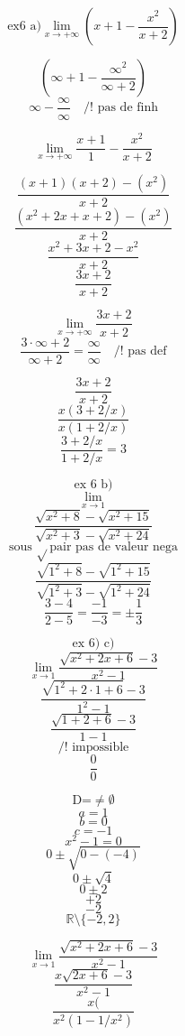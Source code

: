 \documentclass{article}
\begin{document}
\[ \text{ex6 a)} \lim_{x \to +\infty} \left( x+1 - \frac{x^2}{x+2} \right) \]

\[ \left( \infty + 1 - \frac{\infty^2}{\infty+2} \right) \]
\[ \infty - \frac{\infty}{\infty} \quad \text{/!\ pas de finh} \]

\[ \lim_{x \to +\infty} \frac{x+1}{1} - \frac{x^2}{x+2} \]

\[ \frac{(x+1)(x+2) - (x^2)}{x+2} \]
\[ \frac{(x^2+2x+x+2) - (x^2)}{x+2} \]
\[ \frac{x^2+3x+2-x^2}{x+2} \]
\[ \frac{3x+2}{x+2} \]

\[ \lim_{x \to +\infty} \frac{3x+2}{x+2} \]
\[ \frac{3 \cdot \infty + 2}{\infty + 2} = \frac{\infty}{\infty} \quad \text{/!\ pas def} \]

\[ \frac{3x+2}{x+2} \]
\[ \frac{x(3+2/x)}{x(1+2/x)} \]
\[ \frac{3+2/x}{1+2/x} = 3 \]

\[ \text{ex 6 b)} \]
\[ \lim_{x \to 1}\]
\[ \frac{\sqrt{x^2+8} - \sqrt{x^2+15}}{\sqrt{x^2+3} - \sqrt{x^2+24}} \]
\[ \text{sous } \sqrt{} \text{pair pas de valeur nega}\]
\[ \frac{\sqrt{1^2+8} - \sqrt{1^2+15}}{\sqrt{1^2+3} - \sqrt{1^2+24}} \]
\[ \frac{3-4}{2-5} = \frac{-1}{-3} = \pm\frac{1}{3} \]


\[ \text{ex 6) c)} \]
\[ \lim_{x \to 1} \frac{\sqrt{x^2 + 2x + 6} - 3}{x^2 - 1} \]
\[ \frac{\sqrt{1^2 + 2 \cdot 1 + 6} - 3}{1^2 - 1} \]
\[ \frac{\sqrt{1 + 2 + 6} - 3}{1 - 1} \]
\[ \text{/!\ impossible} \]
\[ \frac{0}{0} \]

\[ \text{D=} \neq \emptyset \]
\[ a = 1 \]
\[ b = 0 \]
\[ c = -1 \]
\[ x^2 - 1 = 0 \]
\[ 0 \pm \sqrt{0 - (-4)} \]
\[ 0 \pm \sqrt{4} \]
\[ 0 \pm 2 \]
\[ +2 \]
\[ -2 \]
\[ \mathbb{R} \setminus \{-2, 2\} \]

\[ \lim_{x \to 1} \frac{\sqrt{x^2 + 2x + 6} - 3}{x^2 - 1} \]
\[ \frac{x \sqrt{2x + 6} - 3}{x^2 - 1} \]
\[ \frac{x(}{x^2(1 - 1/x^2)} \]
\end{document}
